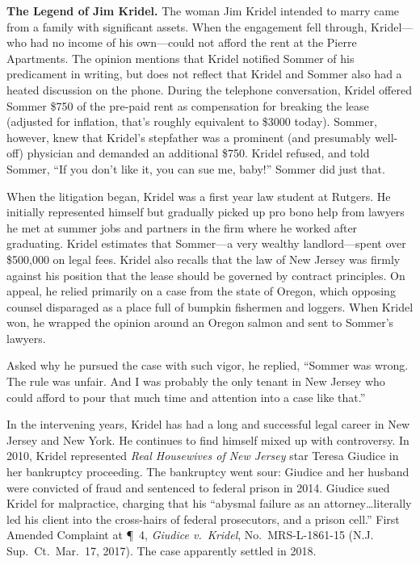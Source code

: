 \item \textbf{The Legend of Jim Kridel.}  The woman Jim Kridel intended to marry
came from a family with significant assets. When the engagement fell through,
Kridel---who had no income of his own---could not afford the rent at the Pierre
Apartments. The opinion mentions that Kridel notified Sommer of his predicament
in writing, but does not reflect that Kridel and Sommer also had a heated
discussion on the phone.  During the telephone conversation, Kridel offered
Sommer \$750 of the pre-paid rent as compensation for breaking the lease
(adjusted for inflation, that's roughly equivalent to \$3000 today).  Sommer,
however, knew that Kridel's stepfather was a prominent (and presumably
well-off) physician and demanded an additional \$750.  Kridel refused, and told
Sommer, ``If you don't like it, you can sue me, baby!'' Sommer did just that. 

When the litigation began, Kridel was a first year law student at Rutgers.  He
initially represented himself but gradually picked up pro bono help from
lawyers he met at summer jobs and partners in the firm where he worked after
graduating.  Kridel estimates that Sommer---a very wealthy landlord---spent
over \$500,000 on legal fees.  Kridel also recalls that the law of New Jersey
was firmly against his position that the lease should be governed by contract
principles.  On appeal, he relied primarily on a case from the state of Oregon,
which opposing counsel disparaged as a place full of bumpkin fishermen and
loggers.  When Kridel won, he wrapped the opinion around an Oregon salmon and
sent to Sommer's lawyers.

Asked why he pursued the case with such vigor, he
replied, ``Sommer was wrong.  The rule was unfair. And I was probably the only
tenant in New Jersey who could afford to pour that much time and attention into
a case like that.''

In the intervening years, Kridel has had a long and successful legal career in
New Jersey and New York. He continues to find himself mixed up with controversy.
In 2010, Kridel represented \textit{Real Housewives of New Jersey} star Teresa
Giudice in her bankruptcy proceeding. The bankruptcy went sour: Giudice and her
husband were convicted of fraud and sentenced to federal prison in 2014. Giudice
sued Kridel for malpractice, charging that his ``abysmal failure as an
attorney\ldots literally led his client into the cross-hairs of federal
prosecutors, and a prison cell.'' First Amended Complaint at \P~4, \emph{Giudice
v.~Kridel}, No.~MRS-L-1861-15 (N.J. Sup.~Ct.\ Mar.~17, 2017). The case
apparently settled in 2018.

